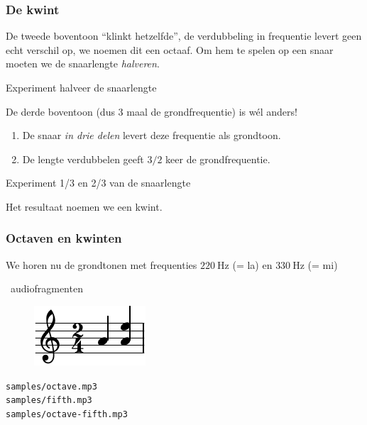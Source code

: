 \documentclass[compress, darktitle, framenumber, handout, totalframenumber]{beamer}
\begin{document}
\begin{frame}
  \frametitle{De kwint}

  De \alert{tweede boventoon} ``klinkt hetzelfde'', de verdubbeling in frequentie levert geen echt verschil op, we noemen dit een \alert{octaaf}.
  \pause
  Om hem te spelen op een snaar moeten we de snaarlengte \emph{halveren}.
  \begin{block}{Experiment}
    halveer de snaarlengte
  \end{block}

  \pause

  De \alert{derde boventoon} (dus 3 maal de grondfrequentie) is w\'el anders!

  \begin{enumerate}
    \item De snaar \emph{in drie delen} levert deze frequentie als grondtoon.
    \item \pause De lengte verdubbelen geeft $3/2$ keer de grondfrequentie.
  \end{enumerate}
  \begin{block}{Experiment}
    1/3 en 2/3 van de snaarlengte
  \end{block}
  \pause
  Het resultaat noemen we een \alert{kwint}.
\end{frame}

\begin{frame}
  \frametitle{Octaven en kwinten}

  We horen nu de grondtonen met frequenties $\SI{220}{\hertz}$ (= la) en $\SI{330}{\hertz}$ (= mi)
  \begin{block}{\twonotes\ audiofragmenten}
    \begin{figure}
      \vspace{-.5cm} %
      \centering
      \includegraphics{scores/fifths-cropped}
    \end{figure}

    \texttt{samples/octave.mp3} \\
    \texttt{samples/fifth.mp3} \\
    \texttt{samples/octave-fifth.mp3}
  \end{block}
\end{frame}
\end{document}

